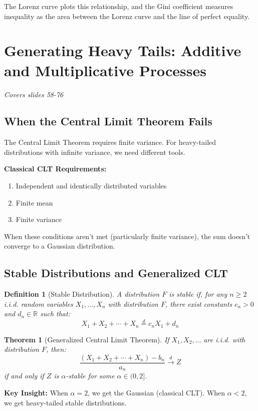 \documentclass[11pt]{article}
\newtheorem{definition}{Definition}
\newtheorem{theorem}{Theorem}
\begin{document}
The Lorenz curve plots this relationship, and the Gini coefficient measures inequality as the area between the Lorenz curve and the line of perfect equality.

\section{Generating Heavy Tails: Additive and Multiplicative Processes}
\textit{Covers slides 58-76}

\subsection{When the Central Limit Theorem Fails}

The Central Limit Theorem requires finite variance. For heavy-tailed distributions with infinite variance, we need different tools.

\textbf{Classical CLT Requirements:}
\begin{enumerate}
\item Independent and identically distributed variables
\item Finite mean
\item Finite variance
\end{enumerate}

When these conditions aren't met (particularly finite variance), the sum doesn't converge to a Gaussian distribution.

\subsection{Stable Distributions and Generalized CLT}

\begin{definition}[Stable Distribution]
A distribution $F$ is stable if, for any $n \geq 2$ i.i.d. random variables $X_1, \ldots, X_n$ with distribution $F$, there exist constants $c_n > 0$ and $d_n \in \mathbb{R}$ such that:
$$X_1 + X_2 + \cdots + X_n \stackrel{d}{=} c_n X_1 + d_n$$
\end{definition}

\begin{theorem}[Generalized Central Limit Theorem]
If $X_1, X_2, \ldots$ are i.i.d. with distribution $F$, then:
$$\frac{(X_1 + X_2 + \cdots + X_n) - b_n}{a_n} \stackrel{d}{\to} Z$$
if and only if $Z$ is $\alpha$-stable for some $\alpha \in (0, 2]$.
\end{theorem}

\textbf{Key Insight:} When $\alpha = 2$, we get the Gaussian (classical CLT). When $\alpha < 2$, we get heavy-tailed stable distributions.
\end{document}
